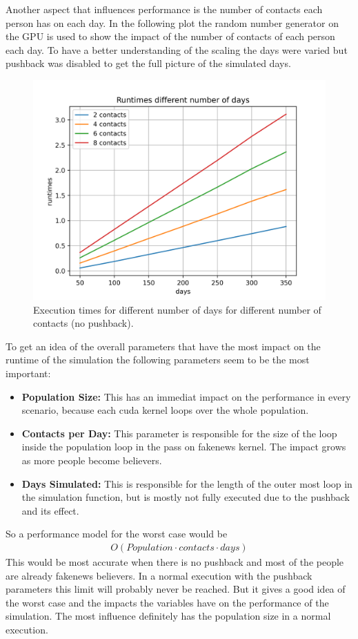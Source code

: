 \documentclass[12pt,a4paper]{article}
\begin{document}
Another aspect that influences performance is the number of contacts each person has on each day. In the following plot the random number generator on the GPU is used to show the impact of the number of contacts of each person each day. To have a better understanding of the scaling the days were varied but pushback was disabled to get the full picture of the simulated days. 
\begin{figure}[H]
  \centering
  \includegraphics[width=12cm]{../contacts.png}
  \caption{Execution times for different number of days for  different number of contacts (no pushback).}
  \label{fig:contacts}
\end{figure}
To get  an idea of the overall parameters that have the most impact on the runtime of the simulation the following parameters seem to be the most important: 
\begin{itemize}
  \item \textbf{Population Size: } This has an immediat impact on the performance in every scenario, because each cuda kernel loops over the whole population.
  \item \textbf{Contacts per Day: } This parameter is responsible for the size of the loop inside the population loop in the pass on  fakenews kernel. The impact grows as more people become believers.
  \item \textbf{Days Simulated: } This is responsible for the length of the outer most loop in the simulation function, but is mostly not fully executed due to the pushback and its effect.
\end{itemize}
So a performance model for the worst case would be 
\begin{align}
  O(Population \cdot contacts \cdot days)
\end{align}
This would be most accurate when there is no pushback and most of the people are already fakenews believers. In a normal execution with the pushback parameters this limit will probably never be reached. But it gives a good idea of the worst case and the impacts the variables have on the performance of the simulation. The most influence definitely has the population size in a normal execution.
\end{document}
